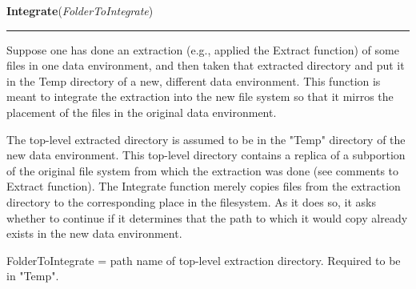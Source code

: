 \hspace{.8\funcindent}\begin{boxedminipage}{\funcwidth}

    \raggedright \textbf{Integrate}(\textit{FolderToIntegrate})

    \vspace{-1.5ex}

    \rule{\textwidth}{0.5\fboxrule}
\setlength{\parskip}{2ex}
    Suppose one has done an extraction (e.g., applied the Extract function)
    of some files in one data environment, and then taken that extracted 
    directory and put it in the Temp directory of a new, different data 
    environment.  This function is meant to integrate the extraction into 
    the new file system so that it mirros the placement of the files in the
    original data environment.

    The top-level extracted directory is assumed to be in the "Temp" 
    directory of the new data environment. This top-level directory 
    contains a replica of a subportion of the original file system from 
    which the extraction was done (see comments to Extract function). The 
    Integrate function merely copies files from the extraction directory to
    the corresponding place in the filesystem. As it does so, it asks 
    whether to continue if it determines that the path to which it would 
    copy already exists in the new data environment.

    FolderToIntegrate = path name of top-level extraction directory. 
    Required to be in "Temp".

\setlength{\parskip}{1ex}
    \end{boxedminipage}

    \label{System:extraction:Raw}

    \vspace{0.5ex}

